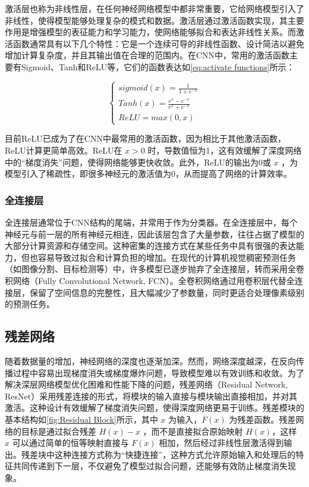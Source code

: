 \documentclass[lang=chs, degree=master, blindreview=false, adobe=false]{yanputhesis}
\begin{document}
激活层也称为非线性层，在任何神经网络模型中都非常重要，它给网络模型引入了非线性，使得模型能够处理复杂的模式和数据。激活层通过激活函数实现，其主要作用是增强模型的表征能力和学习能力，使网络能够拟合和表达非线性关系。而激活函数通常具有以下几个特性：它是一个连续可导的非线性函数、设计简洁以避免增加计算复杂度，并且其输出值在合理的范围内。在CNN中，常用的激活函数主要有Sigmoid\cite{han1995influence}、Tanh\cite{lecun2012efficient}和ReLU\cite{simonyan2014very}等，它们的函数表达如\autoref{eq:activate functions}所示：

\begin{equation}
    \label{eq:activate functions}
    \begin{cases}
       sigmoid(x) = \frac{1}{1+e^{-x}} \\
       Tanh(x) = \frac{e^x - e^{-x}}{e^x + e^{-x}} \\
       ReLU = max(0,x)
    \end{cases}
\end{equation}

目前ReLU已成为了在CNN中最常用的激活函数，因为相比于其他激活函数，ReLU计算更简单高效。ReLU在 $x>0$ 时，导数值恒为1，这有效缓解了深度网络中的“梯度消失”问题，使得网络能够更快收敛。此外，ReLU的输出为0或 $x$ ，为模型引入了稀疏性，即很多神经元的激活值为0，从而提高了网络的计算效率。

\subsubsection{全连接层}

全连接层通常位于CNN结构的尾端，并常用于作为分类器。在全连接层中，每个神经元与前一层的所有神经元相连，因此该层包含了大量参数，往往占据了模型的大部分计算资源和存储空间。这种密集的连接方式在某些任务中具有很强的表达能力，但也容易导致过拟合和计算负担的增加。在现代的计算机视觉稠密预测任务（如图像分割、目标检测等）中，许多模型已逐步抛弃了全连接层，转而采用全卷积网络（Fully Convolutional Network, FCN）\cite{long2015fully}。全卷积网络通过用卷积层代替全连接层，保留了空间信息的完整性，且大幅减少了参数量，同时更适合处理像素级别的预测任务。

\subsection{残差网络}

随着数据量的增加，神经网络的深度也逐渐加深。然而，网络深度越深，在反向传播过程中容易出现梯度消失或梯度爆炸问题，导致模型难以有效训练和收敛。为了解决深层网络模型优化困难和性能下降的问题，残差网络（Residual Network, ResNet）\cite{he2016deep}采用残差连接的形式，将模块的输入直接与模块输出直接相加，并对其激活。这种设计有效缓解了梯度消失问题，使得深度网络更易于训练。残差模块的基本结构如\autoref{fig:Residual Block}所示，其中 $x$ 为输入，$F(x)$  为残差函数。残差网络的目标是通过拟合残差 $H(x)-x$ ，而不是直接拟合原始映射 $H(x)$，这样 $x$ 可以通过简单的恒等映射直接与 $F(x)$  相加，然后经过非线性层激活得到输出。残差块中这种连接方式称为“快捷连接”，这种方式允许原始输入和处理后的特征共同传递到下一层，不仅避免了模型过拟合问题，还能够有效防止梯度消失现象。
\end{document}
